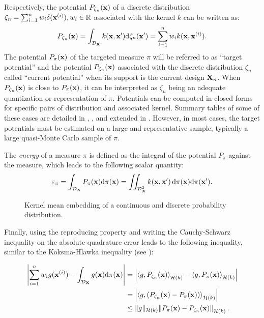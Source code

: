 Respectively, the potential $P_{\zeta_n}({\bf x})$ of a discrete distribution $\zeta_n = \sum_{i=1}^{n} w_i \delta({\bf x}^{(i)}), w_i \in \mathbb{R}$ associated with the kernel $k$ can be written as:
\begin{equation}\label{eq:potential}
    P_{\zeta_n}({\bf x}) =  \int_{\mathcal{D}_{{\bf X}}} k({\bf x}, {\bf x}') \mathrm{d} \zeta_n({\bf x}') = \sum_{i=1}^{n} w_i k({\bf x}, {\bf x}^{(i)}).
\end{equation}
The potential $P_{\pi}({\bf x})$ of the targeted measure $\pi$ will be referred to as ``target potential'' and the potential $P_{\zeta_n}({\bf x})$ associated with the discrete distribution $\zeta_n$ called ``current potential'' when its support is the current design ${\bf X}_n$. 
When $P_{\zeta_n}({\bf x})$ is close to $P_{\pi}({\bf x})$, it can be interpreted as $\zeta_n$ being an adequate quantization or representation of $\pi$. %
Potentials can be computed in closed forms for specific pairs of distribution and associated kernel. 
Summary tables of some of these cases are detailed in \cite[Sec. 3.4]{briol_phd_2019}, \cite[Sec. 4]{pronzato_zhigljavsky_2020}, and extended in \cite{fekhari_iooss_2023}. 
However, in most cases, the target potentials must be estimated on a large and representative sample, typically a large quasi-Monte Carlo sample of $\pi$.


The \emph{energy} of a measure $\pi$ is defined as the integral of the potential $P_\pi$ against the measure, which leads to the following scalar quantity:
\begin{equation}
    \varepsilon_\pi= \int_{\mathcal{D}_{{\bf X}}} P_{\pi}({\bf x}) \mathrm{d} \pi({\bf x}) = \iint_{\mathcal{D}_{{\bf X}}^2} k({\bf x}, {\bf x}')\, \mathrm{d}\pi({\bf x}) \mathrm{d}\pi({\bf x}').
\end{equation}
\label{eq:target_energy}

\begin{figure}
    \centering
    
    \caption{Kernel mean embedding of a continuous and discrete probability distribution.}
    \label{fig:kernel_mean_embedding}
\end{figure}
Finally, using the reproducing property and writing the Cauchy-Schwarz inequality on the absolute quadrature error leads to the following inequality, similar to the Koksma-Hlawka inequality  (see \citealp{briol_oates_2019}): 

\begin{subequations}
\begin{align}
    \left| \sum_{i=1}^{n} w_i g({\bf x}^{(i)}) - \int_{\mathcal{D}_{{\bf X}}} g({\bf x}) \mathrm{d} \pi({\bf x}) \right| &= \left| \left\langle g, P_{\zeta_n}({\bf x}) \right\rangle_{\mathcal{H}(k)} - \left\langle g, P_{\pi}({\bf x}) \right\rangle_{\mathcal{H}(k)} \right| \\
    &= \left| \left\langle g, \left(P_{\zeta_n}({\bf x}) - P_{\pi}({\bf x})\right) \right\rangle_{\mathcal{H}(k)} \right|\\
    &\leq \lVert g \lVert_{\mathcal{H}(k)}  \left\lVert P_{\pi}({\bf x}) - P_{\zeta_n}({\bf x}) \right\lVert_{\mathcal{H}(k)}.
    \label{eq:quad_error}
\end{align}
\end{subequations}

